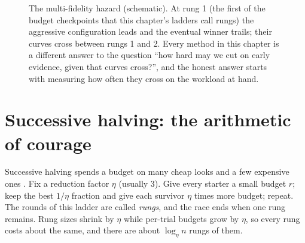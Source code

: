 \begin{figure}[t]
\centering
{}
\caption{The multi-fidelity hazard (schematic). At rung 1 (the first of
the budget checkpoints that this chapter's ladders call rungs) the aggressive
configuration leads and the eventual winner trails; their curves cross
between rungs 1 and 2. Every method in this chapter is a different answer
to the question ``how hard may we cut on early evidence, given that curves
cross?'', and the honest answer starts with measuring how often they cross
on the workload at hand.}
\label{fig:curves}
\end{figure}

\section{Successive halving: the arithmetic of courage}

Successive halving spends a budget on many cheap looks and a few expensive
ones \citep{jamieson2016successive}. Fix a reduction factor $\eta$
(usually 3). Give every starter a small budget $r$; keep the best $1/\eta$
fraction and give each survivor $\eta$ times more budget; repeat. The
rounds of this ladder are called \emph{rungs}, and the race ends when
one rung remains. Rung sizes shrink by $\eta$ while per-trial budgets grow by
$\eta$, so every rung costs about the same, and there are about
$\log_\eta n$ rungs of them.

